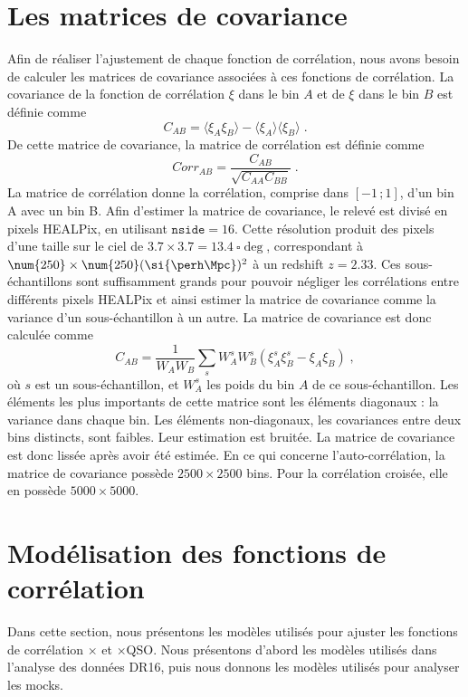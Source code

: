 \section{Les matrices de covariance}
\label{sec:calcul_cov}
Afin de réaliser l'ajustement de chaque fonction de corrélation, nous avons besoin de calculer les matrices de covariance associées à ces fonctions de corrélation. La covariance de la fonction de corrélation $\xi$ dans le bin $A$ et de $\xi$ dans le bin $B$ est définie comme
\begin{equation}
  C_{AB} = \langle \xi_A \xi_B \rangle - \langle \xi_A \rangle \langle \xi_B \rangle \; .
\end{equation}
De cette matrice de covariance, la matrice de corrélation est définie comme
\begin{equation}
  Corr_{AB} = \frac{C_{AB}}{\sqrt{C_{AA} C_{BB}}} \; .
\end{equation}
La matrice de corrélation donne la corrélation, comprise dans $[-1 \, ; 1]$, d'un bin A avec un bin B.
Afin d'estimer la matrice de covariance, le relevé est divisé en pixels HEALPix, en utilisant $\texttt{nside} = \num{16}$. Cette résolution produit des pixels d'une taille sur le ciel de $\num{3.7} \times \num{3.7} = \SI{13.4}{\square\deg}$, correspondant à $\num{250} \times \num{250} (\si{\perh\Mpc})^2$ à un redshift $z = \num{2.33}$. Ces sous-échantillons sont suffisamment grands pour pouvoir négliger les corrélations entre différents pixels HEALPix et ainsi estimer la matrice de covariance comme la variance d'un sous-échantillon à un autre. La matrice de covariance est donc calculée comme
\begin{equation}
  C_{AB} = \frac{1}{W_A W_B} \sum_s W_A^s W_B^s \left( \xi_A^s \xi_B^s - \xi_A \xi_B \right) \; ,
\end{equation}
où $s$ est un sous-échantillon, et $W_A^s$ les poids du bin $A$ de ce sous-échantillon.
Les éléments les plus importants de cette matrice sont les éléments diagonaux : la variance dans chaque bin. Les éléments non-diagonaux, les covariances entre deux bins distincts, sont faibles. Leur estimation est bruitée. La matrice de covariance est donc lissée après avoir été estimée.
En ce qui concerne l'auto-corrélation, la matrice de covariance possède $\num{2500} \times \num{2500}$ bins. Pour la corrélation croisée, elle en possède $\num{5000} \times \num{5000}$.



\section{Modélisation des fonctions de corrélation}
Dans cette section, nous présentons les modèles utilisés pour ajuster les fonctions de corrélation \lya{}$\times$\lya{} et \lya{}$\times$QSO. Nous présentons d'abord les modèles utilisés dans l'analyse des données DR16, puis nous donnons les modèles utilisés pour analyser les mocks.

